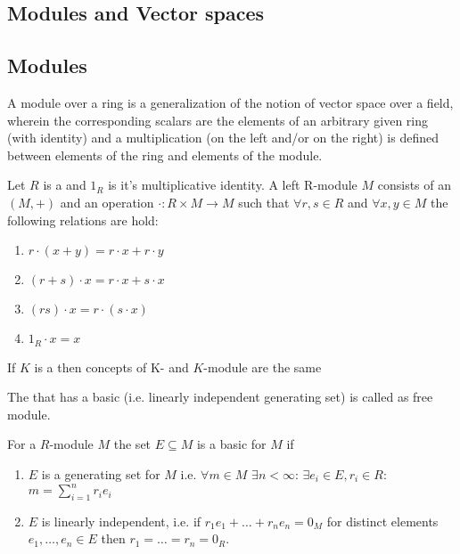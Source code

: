 \begin{appendices}
\section{Modules and Vector spaces}

\subsection{Modules}

A module over a ring is a generalization of the notion of vector space
over a field, wherein the corresponding scalars are the elements of an
arbitrary given ring (with identity) and a multiplication (on the left
and/or on the right) is defined between elements of the ring and
elements of the module.

\begin{definition}[Module]
  Let $R$ is a  and $1_R$ is it's multiplicative
  identity. A left R-module $M$ consists of an 
  $\left(M, +\right)$ and an operation $\cdot: R \times M \to M$ such
  that $\forall r,s \in R$ and $\forall x,y \in M$ the following
  relations are hold:
  \begin{enumerate}
  \item $r \cdot \left(x+y\right) = r \cdot x + r \cdot y$
  \item $\left(r + s \right) \cdot x = r \cdot x + s \cdot x$
  \item $\left(rs\right) \cdot x = r \cdot \left(s \cdot x\right)$
  \item $1_R \cdot x = x$
  \end{enumerate}
  \label{def:module}
\end{definition}

\begin{example}[Module]
  If $K$ is a  then concepts of
  K- and $K$-module are the same
\end{example}

\begin{definition}
  The  that has a basic (i.e. linearly independent
  generating set) 
  is called as free module.

  For a $R$-module $M$ the set $E \subseteq M$ is a basic for $M$ if
  \begin{enumerate}
  \item $E$ is a generating set for $M$ i.e. $\forall m \in M$
    $\exists n < \infty$: $\exists e_i \in E, r_i \in R$:
    $m = \sum_{i = 1}^n r_i e_i$
  \item $E$ is linearly independent, i.e. if $r_1 e_1 + \dots + r_n
    e_n = 0_M$ for distinct elements $e_1, \dots, e_n \in E$ then
    $r_1 = \dots = r_n = 0_R$.
  \end{enumerate}
  \label{def:freemodule}
\end{definition}


\end{appendices}
